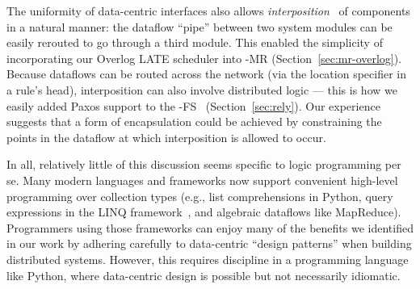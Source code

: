 The uniformity of data-centric interfaces also allows
\emph{interposition}~\cite{jones-sosp93} of components in a natural manner: the
dataflow ``pipe'' between two system modules can be easily rerouted to go
through a third module. This enabled the simplicity of incorporating our Overlog
LATE scheduler into \BOOM-MR (Section~\ref{sec:mr-overlog}).  Because dataflows
can be routed across the network (via the location specifier in a rule's head),
interposition can also involve distributed logic --- this is how we easily added
Paxos support to the \BOOM-FS \NN\ (Section~\ref{sec:rely}).  Our experience
suggests that a form of encapsulation could be achieved by constraining the
points in the dataflow at which interposition is allowed to occur.



In all, relatively little of this discussion seems specific to logic programming
per se.  Many modern languages and frameworks now support convenient high-level
programming over collection types (e.g., list comprehensions in Python, query
expressions in the LINQ framework~\cite{linq}, and algebraic dataflows like
MapReduce).  Programmers using those frameworks can enjoy many of the benefits
we identified in our work by adhering carefully to data-centric ``design
patterns'' when building distributed systems.  However, this requires
discipline in a programming language like Python, where data-centric design is
possible but not necessarily idiomatic.

